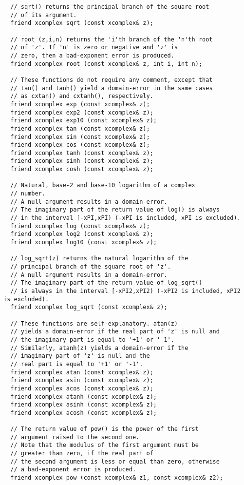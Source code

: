 \documentclass{article}
\begin{document}
\begin{verbatim}
  // sqrt() returns the principal branch of the square root
  // of its argument.
  friend xcomplex sqrt (const xcomplex& z);

  // root (z,i,n) returns the 'i'th branch of the 'n'th root
  // of 'z'. If 'n' is zero or negative and 'z' is
  // zero, then a bad-exponent error is produced.
  friend xcomplex root (const xcomplex& z, int i, int n);

  // These functions do not require any comment, except that
  // tan() and tanh() yield a domain-error in the same cases
  // as cxtan() and cxtanh(), respectively.
  friend xcomplex exp (const xcomplex& z);
  friend xcomplex exp2 (const xcomplex& z);
  friend xcomplex exp10 (const xcomplex& z);
  friend xcomplex tan (const xcomplex& z);
  friend xcomplex sin (const xcomplex& z);
  friend xcomplex cos (const xcomplex& z);
  friend xcomplex tanh (const xcomplex& z);
  friend xcomplex sinh (const xcomplex& z);
  friend xcomplex cosh (const xcomplex& z);

  // Natural, base-2 and base-10 logarithm of a complex 
  // number.
  // A null argument results in a domain-error.
  // The imaginary part of the return value of log() is always
  // in the interval [-xPI,xPI) (-xPI is included, xPI is excluded).
  friend xcomplex log (const xcomplex& z);
  friend xcomplex log2 (const xcomplex& z);
  friend xcomplex log10 (const xcomplex& z);
  
  // log_sqrt(z) returns the natural logarithm of the
  // principal branch of the square root of 'z'.
  // A null argument results in a domain-error.
  // The imaginary part of the return value of log_sqrt()
  // is always in the interval [-xPI2,xPI2) (-xPI2 is included, xPI2 is excluded).
  friend xcomplex log_sqrt (const xcomplex& z);
  
  // These functions are self-explanatory. atan(z)
  // yields a domain-error if the real part of 'z' is null and
  // the imaginary part is equal to '+1' or '-1'.
  // Similarly, atanh(z) yields a domain-error if the 
  // imaginary part of 'z' is null and the
  // real part is equal to '+1' or '-1'.
  friend xcomplex atan (const xcomplex& z);
  friend xcomplex asin (const xcomplex& z);
  friend xcomplex acos (const xcomplex& z);
  friend xcomplex atanh (const xcomplex& z);
  friend xcomplex asinh (const xcomplex& z);
  friend xcomplex acosh (const xcomplex& z);

  // The return value of pow() is the power of the first
  // argument raised to the second one.
  // Note that the modulus of the first argument must be
  // greater than zero, if the real part of
  // the second argument is less or equal than zero, otherwise
  // a bad-exponent error is produced.
  friend xcomplex pow (const xcomplex& z1, const xcomplex& z2);
  

\end{verbatim}
\end{document}
